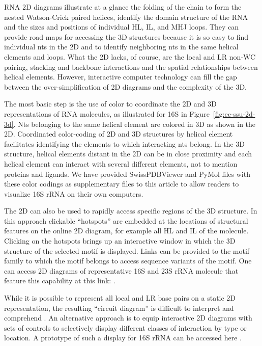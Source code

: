 RNA 2D diagrams illustrate at a glance the folding of the chain to form the
nested Watson-Crick paired helices, identify the domain structure of the RNA and
the sizes and positions of individual HL, IL, and MHJ loops. They can provide
road maps for accessing the 3D structures because it is so easy to find
individual nts in the 2D and to identify neighboring nts in the same helical
elements and loops. What the 2D lacks, of course, are the local and LR non-WC
pairing, stacking and backbone interactions and the spatial relationships
between helical elements. However, interactive computer technology can fill the
gap between the over-simplification of 2D diagrams and the complexity of the 3D. 

The most basic step is the use of color to coordinate the 2D and 3D
representations of RNA molecules, as illustrated for 16S in
Figure~\ref{fig:ec-ssu-2d-3d}. Nts belonging to the same helical element are
colored in 3D as shown in the 2D. Coordinated color-coding of 2D and 3D
structures by helical element facilitates identifying the elements to which
interacting nts belong. In the 3D structure, helical elements distant in the 2D
can be in close proximity and each helical element can interact with several
different elements, not to mention proteins and ligands.  We have provided
SwissPDBViewer and PyMol files with these color codings as supplementary files
to this article to allow readers to visualize \EC{} 16S rRNA on their own
computers. 

The 2D can also be used to rapidly access specific regions of the 3D structure.
In this approach clickable ``hotspots'' are embedded at the locations of
structural features on the online 2D diagram, for example all HL and IL of the
molecule. Clicking on the hotspots brings up an interactive window in which the
3D structure of the selected motif is displayed. Links can be provided to the
motif family to which the motif belongs to access sequence variants of the
motif. One can access 2D diagrams of representative 16S and 23S rRNA molecule
that feature this capability at this link:
.

While it is possible to represent all local and LR base pairs on a static 2D
representation, the resulting ``circuit diagram'' is difficult to interpret and
comprehend \cite{Lescoute2006a}. An alternative approach is to equip interactive
2D diagrams with sets of controls to selectively display different classes of
interaction by type or location. A prototype of such a display for 16S rRNA can
be accessed here .

